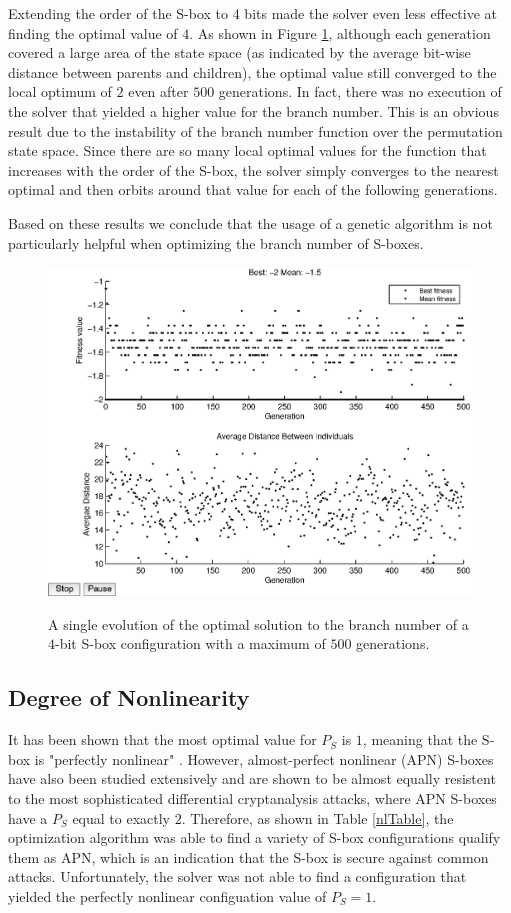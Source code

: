 \documentclass[11pt]{article}
\begin{document}
Extending the order of the S-box to $4$ bits made the solver even less effective at finding the optimal value of $4$. As shown in Figure \ref{bn16}, although each generation covered a large area of the state space (as indicated by the average bit-wise distance between parents and children), the optimal value still converged to the local optimum of $2$ even after $500$ generations. In fact, there was no execution of the solver that yielded a higher value for the branch number. This is an obvious result due to the instability of the branch number function over the permutation state space. Since there are so many local optimal values for the function that increases with the order of the S-box, the solver simply converges to the nearest optimal and then orbits around that value for each of the following generations. 

Based on these results we conclude that the usage of a genetic algorithm is not particularly helpful when optimizing the branch number of S-boxes.

\begin{figure}
	\centering
	\includegraphics[scale=0.5]{images/bn_results16.eps} \\
	\label{bn16}
\caption{A single evolution of the optimal solution to the branch number of a $4$-bit S-box configuration with a maximum of $500$ generations.}
\end{figure}

\subsection{Degree of Nonlinearity}
It has been shown that the most optimal value for $P_S$ is $1$, meaning that the S-box is "perfectly nonlinear" \cite{ProvableSecurity}. However, almost-perfect nonlinear (APN) S-boxes have also been studied extensively and are shown to be almost equally resistent to the most sophisticated differential cryptanalysis attacks, where APN S-boxes have a $P_S$ equal to exactly $2$. Therefore, as shown in Table \ref{nlTable}, the optimization algorithm was able to find a variety of S-box configurations qualify them as APN, which is an indication that the S-box is secure against common attacks. Unfortunately, the solver was not able to find a configuration that yielded the perfectly nonlinear configuation value of $P_S = 1$. 
\end{document}
